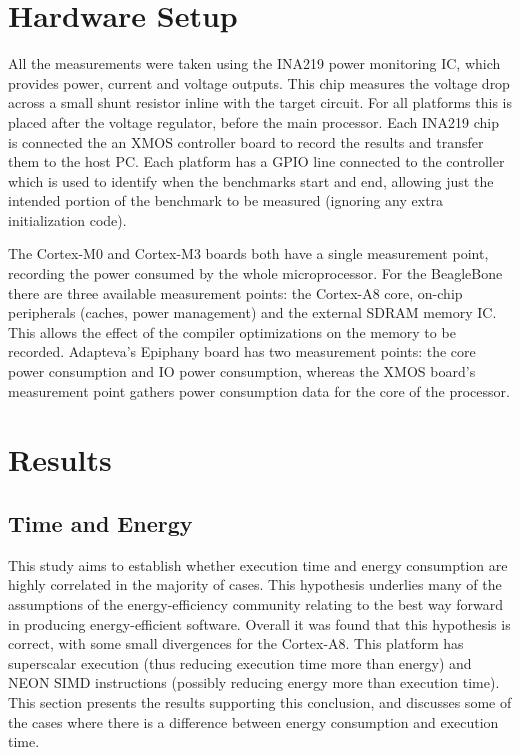 \documentclass[twocolumn]{article}
\begin{document}
\section{Hardware Setup}

All the measurements were taken using the INA219 power monitoring IC\cite{INA219}, which provides power, current and voltage outputs. This chip measures the voltage drop across a small shunt resistor inline with the target circuit. For all platforms this is placed after the voltage regulator, before the main processor. Each INA219 chip is connected the an XMOS controller board to record the results and transfer them to the host PC. Each platform has a GPIO line connected to the controller which is used to identify when the benchmarks start and end, allowing just the intended portion of the benchmark to be measured (ignoring any extra initialization code).

The Cortex-M0 and Cortex-M3 boards both have a single measurement point, recording the power consumed by the whole microprocessor. For the BeagleBone there are three available measurement points: the Cortex-A8 core, on-chip peripherals (caches, power management) and the external SDRAM memory IC. This allows the effect of the compiler optimizations on the memory to be recorded. Adapteva's Epiphany board has two measurement points: the core power consumption and IO power consumption, whereas the XMOS board's measurement point gathers power consumption data for the core of the processor.

\section{Results}


\subsection*{Time and Energy}

This study aims to establish whether execution time and energy consumption are highly correlated in the majority of cases. This hypothesis underlies many of the assumptions of the energy-efficiency community relating to the best way forward in producing energy-efficient software. Overall it was found that this hypothesis is correct, with some small divergences for the Cortex-A8. This platform has superscalar execution (thus reducing execution time more than energy) and NEON SIMD instructions (possibly reducing energy more than execution time). This section presents the results supporting this conclusion, and discusses some of the cases where there is a difference between energy consumption and execution time.
\end{document}
